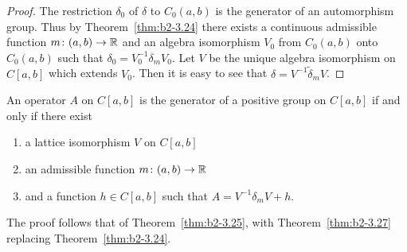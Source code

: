 \begin{proof}
The restriction $\delta_{0}$ of\/ $\delta$ to $C_{0}(a,b)$ is the generator of an automorphism group.
Thus by Theorem~\ref{thm:b2-3.24} there exists a continuous admissible function $m \colon (a,b) \to \mathbb{R}$ and an algebra isomorphism $V_{0}$ from $C_{0}(a,b)$ onto $C_{0}(a,b)$ such that $\delta_{0} = V_{0}^{-1}\delta_{m}V_{0}$.
Let $V$ be the unique algebra isomorphism on $C[a,b]$ which extends $V_{0}$.
Then it is easy to see that $\delta = V^{-1}\tilde{\delta}_{m}V$.
\end{proof}
\begin{theorem}\label{thm:b2-3.28}
%
An operator $A$ on $C[a,b]$ is the generator of a positive group on $C[a,b]$ if and only if there exist
\begin{enumerate}[\upshape (i)]
\item 
a lattice isomorphism $V$ on $C[a,b]$
\item 
an admissible function $m \colon (a,b) \to \mathbb{R}$
\item 
and a function $h \in C[a,b]$ such that $A = V^{-1}\delta_{m}V + h$.
\end{enumerate}
\end{theorem}
The proof follows that of Theorem~\ref{thm:b2-3.25}, with
Theorem~\ref{thm:b2-3.27} replacing Theorem~\ref{thm:b2-3.24}.
